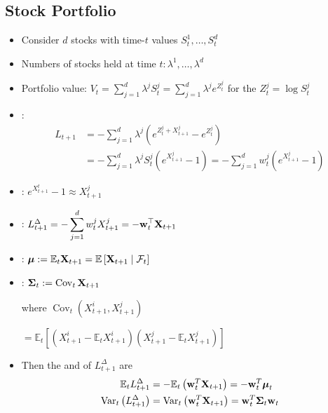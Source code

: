 \subsection*{Stock Portfolio}
\begin{itemize}[leftmargin=*]
    \item Consider $d$ stocks with time-$t$ values $S_{t}^{1}, \ldots, S_{t}^{d}$
    \item Numbers of stocks held at time $t: \lambda^{1}, \ldots, \lambda^{d}$
    \item Portfolio value: $V_{t}=\sum_{j=1}^{d} \lambda^{j} S_{t}^{j}=\sum_{j=1}^{d} \lambda^{j} e^{Z_{t}^{j}}$ for the  $Z_{t}^{j}=\log S_{t}^{j}$
    \item {}:
    $$
    \begin{aligned}
        L_{t+1}&=-\sum_{j=1}^{d} \lambda^{j}\left(e^{Z_{t}^{j}+X_{t+1}^{j}}-e^{Z_{t}^{j}}\right) \\
        &=-\sum_{j=1}^{d} \lambda^{j} S_{t}^{j}\left(e^{X_{t+1}^{j}}-1\right)=-\sum_{j=1}^{d} w_{t}^{j}\left(e^{X_{t+1}^{j}}-1\right)
    \end{aligned}
    $$
    \item {}: $e^{X_{t+1}^{t}}-1 \approx X_{t+1}^{j}$
    \item {}: $L_{t+1}^{\Delta}=-\displaystyle\sum_{j=1}^{d} w_{t}^{j} X_{t+1}^{j}=-\boldsymbol{\mathbf{w}}_{t}^{\top} \boldsymbol{\mathbf{X}}_{t+1}$
    \item {}: $\boldsymbol{\mathbf{\mu}} := \mathbb{E}_{t} \boldsymbol{\mathbf{X}}_{t+1}=\mathbb{E}\left[\boldsymbol{\mathbf{X}}_{t+1} \mid \mathcal{F}_{t}\right]$
    \item {}:
    $
        \boldsymbol{\mathbf{\Sigma}}_t := \operatorname{Cov}_{t} \boldsymbol{\mathbf{X}}_{t+1} 
$

where $\operatorname{Cov}_{t}\left(X_{t+1}^{i}, X_{t+1}^{j}\right)$

$=\mathbb{E}_{t}\left[\left(X_{t+1}^{i}-\mathbb{E}_{t} X_{t+1}^{i}\right)\left(X_{t+1}^{j}-\mathbb{E}_{t} X_{t+1}^{j}\right)\right]$
    \item Then the  and  of $L_{t+1}^{\Delta}$ are
$$
\begin{aligned}
\mathbb{E}_{t} L_{t+1}^{\Delta}&=-\mathbb{E}_{t}\left(\boldsymbol{\mathbf{w}}_{t}^{T} \boldsymbol{\mathbf{X}}_{t+1}\right)=-\boldsymbol{\mathbf{w}}_{t}^{T} \boldsymbol{\mathbf{\mu}}_{t} \\ \operatorname{Var}_{t}\left(L_{t+1}^{\Delta}\right)&=\operatorname{Var}_{t}\left(\boldsymbol{\mathbf{w}}_{t}^{T} \boldsymbol{\mathbf{X}}_{t+1}\right)=\boldsymbol{\mathbf{w}}_{t}^{T} \boldsymbol{\mathbf{\Sigma}}_{t} \boldsymbol{\mathbf{w}}_{t}
\end{aligned}
$$
\end{itemize}










